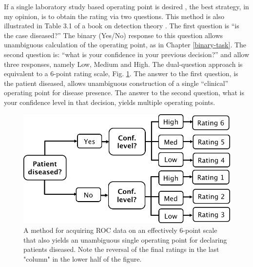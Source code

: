 \documentclass[
]{book}
\begin{document}
If a single laboratory study based operating point is desired \citep{RN2660}, the best strategy, in my opinion, is to obtain the rating via two questions. This method is also illustrated in Table 3.1 of a book on detection theory \citep{macmillan2004detection}. The first question is ``is the case diseased?'' The binary (Yes/No) response to this question allows unambiguous calculation of the operating point, as in Chapter \ref{binary-task}. The second question is: ``what is your confidence in your previous decision?'' and allow three responses, namely Low, Medium and High. The dual-question approach is equivalent to a 6-point rating scale, Fig. \ref{fig:SixPointScale}. The answer to the first question, is the patient diseased, allows unambiguous construction of a single ``clinical'' operating point for disease presence. The answer to the second question, what is your confidence level in that decision, yields multiple operating points.

\begin{figure}
\includegraphics[width=11.39in]{images/AcquiringData6PointScale} \caption{A method for acquiring ROC data on an effectively 6-point scale that also yields an unambiguous single operating point for declaring patients diseased. Note the reversal of the final ratings in the last "column" in the lower half of the figure.}\label{fig:SixPointScale}
\end{figure}
\end{document}
